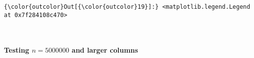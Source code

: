 \documentclass[11pt]{article}
\begin{document}
\begin{Verbatim}[commandchars=\\\{\}]
{\color{outcolor}Out[{\color{outcolor}19}]:} <matplotlib.legend.Legend at 0x7f284108c470>
\end{Verbatim}
            
    \begin{center}
    \end{center}
    { \hspace*{\fill} \\}
    
    \paragraph{\texorpdfstring{Testing \(n = 5000000\) and larger
columns}{Testing n = 5000000 and larger columns}}\label{testing-n-5000000-and-larger-columns}
\end{document}
